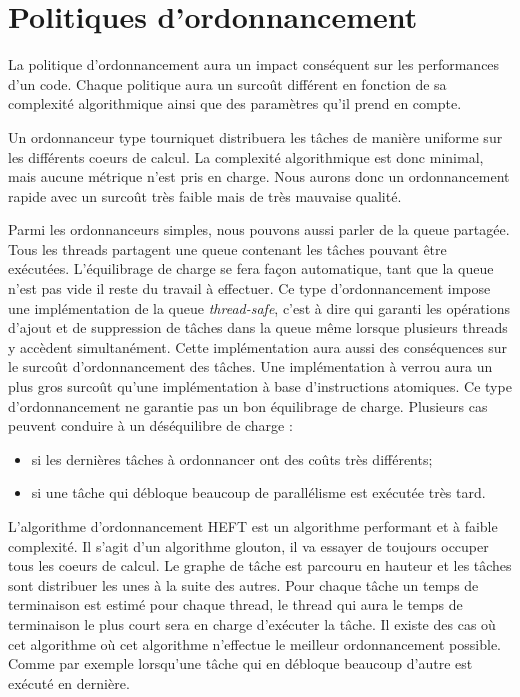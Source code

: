\section{Politiques d'ordonnancement}
La politique d'ordonnancement aura un impact conséquent sur les performances d'un code.
%
Chaque politique aura un surcoût différent en fonction de sa complexité algorithmique ainsi que des paramètres qu'il prend en compte.


Un ordonnanceur type tourniquet distribuera les tâches de manière uniforme sur les différents coeurs de calcul.
%
La complexité algorithmique est donc minimal, mais aucune métrique n'est pris en charge.
%
Nous aurons donc un ordonnancement rapide avec un surcoût très faible mais de très mauvaise qualité.


Parmi les ordonnanceurs simples, nous pouvons aussi parler de la queue partagée.
%
Tous les threads partagent une queue contenant les tâches pouvant être exécutées.
%
L'équilibrage de charge se fera façon automatique, tant que la queue n'est pas vide il reste du travail à effectuer.
%
Ce type d'ordonnancement impose une implémentation de la queue {\em thread-safe}, c'est à dire qui garanti les opérations d'ajout et de suppression de tâches dans la queue même lorsque plusieurs threads y accèdent simultanément.
%
Cette implémentation aura aussi des conséquences sur le surcoût d'ordonnancement des tâches.
%
Une implémentation à verrou aura un plus gros surcoût qu'une implémentation à base d'instructions atomiques.
%
Ce type d'ordonnancement ne garantie pas un bon équilibrage de charge.
%
Plusieurs cas peuvent conduire à un déséquilibre de charge :
\begin{itemize}
  \item si les dernières tâches à ordonnancer ont des coûts très différents;
  \item si une tâche qui débloque beaucoup de parallélisme est exécutée très tard.
\end{itemize}


L'algorithme d'ordonnancement HEFT est un algorithme performant et à faible complexité\cite{heft2}.
%
Il s'agit d'un algorithme glouton, il va essayer de toujours occuper tous les coeurs de calcul.
%
Le graphe de tâche est parcouru en hauteur et les tâches sont distribuer les unes à la suite des autres.
%
Pour chaque tâche un temps de terminaison est estimé pour chaque thread, le thread qui aura le temps de terminaison le plus court sera en charge d'exécuter la tâche.
%
Il existe des cas où cet algorithme où cet algorithme n'effectue le meilleur ordonnancement possible.
%
Comme par exemple lorsqu'une tâche qui en débloque beaucoup d'autre est exécuté en dernière.
